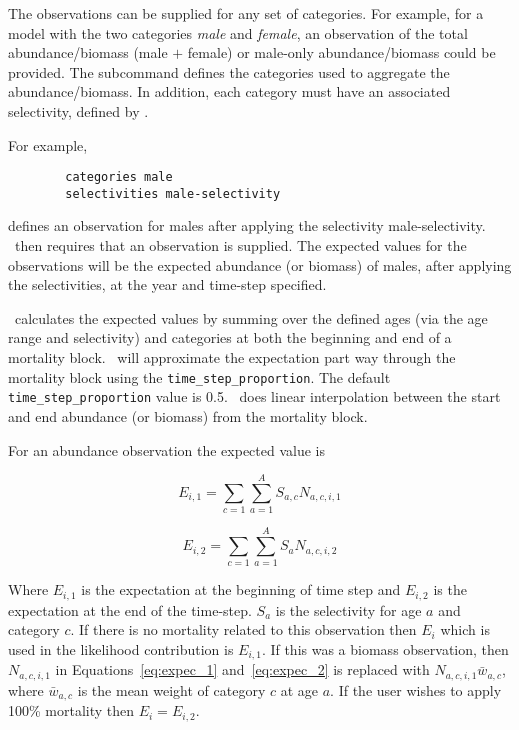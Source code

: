 The observations can be supplied for any set of categories. For example, for a model with the two categories \emph{male} and \emph{female}, an observation of the total abundance/biomass (male $+$ female) or male-only abundance/biomass could be provided. The subcommand  defines the categories used to aggregate the abundance/biomass. In addition, each category must have an associated selectivity, defined by .

For example,

{\small{\begin{verbatim}
		categories male
		selectivities male-selectivity
\end{verbatim}}}

defines an observation for males after applying the selectivity male-selectivity. \CNAME\ then requires that an observation is supplied. The expected values for the observations will be the expected abundance (or biomass) of males, after applying the selectivities, at the year and time-step specified.

\CNAME\ calculates the expected values by summing over the defined ages (via the age range and selectivity) and categories at both the beginning and end of a mortality block. \CNAME\ will approximate the expectation part way through the mortality block using the \texttt{time\_step\_proportion}. The default \texttt{time\_step\_proportion} value is 0.5. \CNAME\ does linear interpolation between the start and end abundance (or biomass) from the mortality block.

For an abundance observation the expected value is

\begin{equation}\label{eq:expec_1}
E_{i,1} = \sum_{c=1}^{} \sum_{a=1}^{A} S_{a,c} N_{a,c,i,1}
\end{equation}

\begin{equation}\label{eq:expec_2}
E_{i,2} = \sum_{c=1}^{} \sum_{a=1}^{A} S_a N_{a,c,i,2}
\end{equation}

Where $E_{i,1}$ is the expectation at the beginning of time step and $E_{i,2}$ is the expectation at the end of the time-step. $S_a$ is the selectivity for age $a$ and category $c$. If there is no mortality related to this observation then $E_i$ which is used in the likelihood contribution is $E_{i,1}$. If this was a biomass observation, then $N_{a,c,i,1}$ in Equations~\eqref{eq:expec_1} and~\eqref{eq:expec_2} is replaced with $N_{a,c,i,1} \bar{w}_{a,c}$, where $\bar{w}_{a,c}$ is the mean weight of category $c$ at age $a$. If the user wishes to apply 100\% mortality then $E_i = E_{i,2}$.

